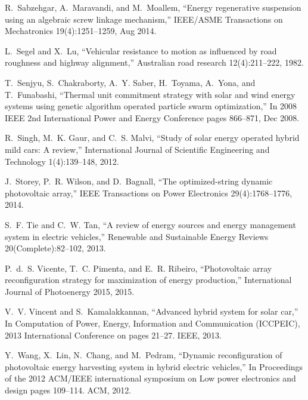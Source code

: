 R.~Sabzehgar, A.~Maravandi, and M.~Moallem,
\newblock ``Energy regenerative suspension using an algebraic screw linkage
  mechanism,''
\newblock IEEE/ASME Transactions on Mechatronics 19(4):1251--1259, Aug
  2014.

L.~Segel and X.~Lu,
\newblock ``Vehicular resistance to motion as influenced by road roughness and
  highway alignment,''
\newblock Australian road research 12(4):211--222, 1982.

T.~Senjyu, S.~Chakraborty, A.~Y. Saber, H.~Toyama, A.~Yona, and T.~Funabashi,
\newblock ``Thermal unit commitment strategy with solar and wind energy systems
  using genetic algorithm operated particle swarm optimization,''
\newblock In 2008 IEEE 2nd International Power and Energy Conference
  pages 866--871, Dec 2008.

R.~Singh, M.~K. Gaur, and C.~S. Malvi,
\newblock ``Study of solar energy operated hybrid mild cars: A review,''
\newblock International Journal of Scientific Engineering and Technology
  1(4):139--148, 2012.

J.~Storey, P.~R. Wilson, and D.~Bagnall,
\newblock ``The optimized-string dynamic photovoltaic array,''
\newblock IEEE Transactions on Power Electronics 29(4):1768--1776, 2014.

S.~F. Tie and C.~W. Tan,
\newblock ``A review of energy sources and energy management system in electric
  vehicles,''
\newblock Renewable and Sustainable Energy Reviews 20(Complete):82--102,
  2013.

P.~d.~S. Vicente, T.~C. Pimenta, and E.~R. Ribeiro,
\newblock ``Photovoltaic array reconfiguration strategy for maximization of
  energy production,''
\newblock International Journal of Photoenergy 2015, 2015.

V.~V. Vincent and S.~Kamalakkannan,
\newblock ``Advanced hybrid system for solar car,''
\newblock In Computation of Power, Energy, Information and Communication
  (ICCPEIC), 2013 International Conference on pages 21--27. IEEE, 2013.

Y.~Wang, X.~Lin, N.~Chang, and M.~Pedram,
\newblock ``Dynamic reconfiguration of photovoltaic energy harvesting system in
  hybrid electric vehicles,''
\newblock In Proceedings of the 2012 ACM/IEEE international symposium on
  Low power electronics and design pages 109--114. ACM, 2012.

